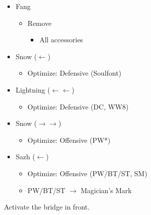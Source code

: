 \begin{menu}
\begin{itemize}
\begin{itemize}
\begin{itemize}
\begin{itemize}
					            \end{itemize}
				      \end{itemize}
			\end{itemize}
			\equip
			\begin{itemize}
				\item Fang
				      \begin{itemize}
					      \item Remove
					            \begin{itemize}
						            \item All accessories
					            \end{itemize}
				      \end{itemize}
				\item Snow ($\leftarrow$)
				      \begin{itemize}
					      \item Optimize: Defensive (Soulfont)
				      \end{itemize}
				\item Lightning ($\leftarrow\leftarrow$)
				      \begin{itemize}
					      \item Optimize: Defensive (DC, WW8)
				      \end{itemize}
				\item Snow ($\rightarrow\rightarrow$)
				      \begin{itemize}
					      \item Optimize: Offensive (PW*)
				      \end{itemize}
				\item Sazh ($\leftarrow$)
				      \begin{itemize}
					      \item Optimize: Offensive (PW/BT/ST, SM)
					      \item PW/BT/ST $\rightarrow$ Magician's Mark
				      \end{itemize}
			\end{itemize}
		\end{itemize}
	\end{menu}

	Activate the bridge in front.

